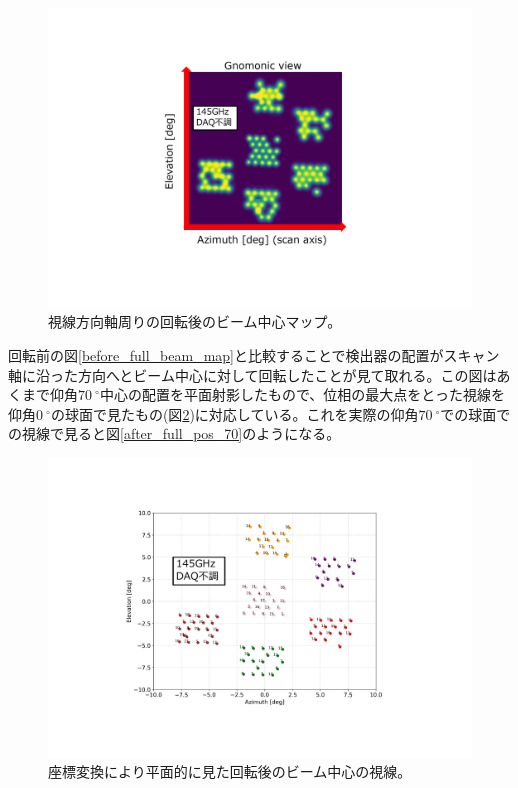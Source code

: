 \begin{figure}[htbp]
  \centering
  \includegraphics[width=0.7\columnwidth]{5_alignment/figs/after_full_gnomonic_mod.pdf}
  \caption{視線方向軸周りの回転後のビーム中心マップ。}
  \label{after_full_beam_map}
\end{figure}
回転前の図\ref{before_full_beam_map}と比較することで検出器の配置がスキャン軸に沿った方向へとビーム中心に対して回転したことが見て取れる。この図はあくまで仰角$\SI{70}{^{\circ}}$中心の配置を平面射影したもので、位相の最大点をとった視線を仰角$\SI{0}{^{\circ}}$の球面で見たもの(図\ref{after_full_pos_0})に対応している。これを実際の仰角$\SI{70}{^{\circ}}$での球面での視線で見ると図\ref{after_full_pos_70}のようになる。
\begin{figure}[htbp]
  \centering
  \includegraphics[width=0.9\columnwidth]{5_alignment/figs/after_full_pos_0_mod.pdf}
  \caption{座標変換により平面的に見た回転後のビーム中心の視線。}
  \label{after_full_pos_0}
\end{figure}
